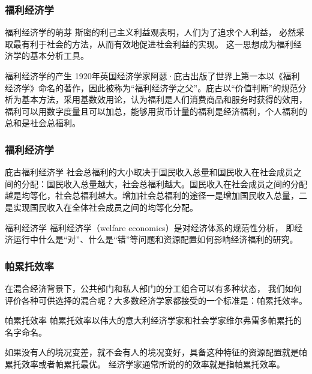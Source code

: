 \documentclass[aspectratio=169, 12pt]{beamer}
\begin{document}
\begin{frame}[plain]
    \frametitle{福利经济学}
    \begin{block}{福利经济学的萌芽}
        斯密的利己主义利益观表明，人们为了追求个人利益，
        必然采取最有利于社会的方法，从而有效地促进社会利益的实现。
        这一思想成为福利经济学的基本分析工具。
    \end{block}
    \begin{block}{福利经济学的产生}
        1920年英国经济学家阿瑟·庇古出版了世界上第一本以《福利经济学》命名的著作，因此被称为“福利经济学之父”。庇古以“价值判断”的规范分析为基本方法，采用基数效用论，认为福利是人们消费商品和服务时获得的效用，福利可以用数字度量且可以加总，能够用货币计量的福利是经济福利，个人福利的总和是社会总福利。
    \end{block}
\end{frame}

\begin{frame}[plain]
    \frametitle{福利经济学}
    \begin{block}{庇古福利经济学}
        社会总福利的大小取决于国民收入总量和国民收入在社会成员之间的分配：国民收入总量越大，社会总福利越大。国民收入在社会成员之间的分配越是均等化，社会总福利越大。增加社会总福利的途径一是增加国民收入总量，二是实现国民收入在全体社会成员之间的均等化分配。
    \end{block}
    \begin{block}{福利经济学}
        福利经济学（welfare economics）是对经济体系的规范性分析，
        即经济运行中什么是“对”、什么是“错”等问题和资源配置如何影响经济福利的研究。  
    \end{block}
\end{frame}

\begin{frame}[plain]
    \frametitle{帕累托效率}
    在混合经济背景下，公共部门和私人部门的分工组合可以有多种状态，
    我们如何评价各种可供选择的混合呢？大多数经济学家都接受的一个标准是：帕累托效率。
    \begin{block}{帕累托效率}
        帕累托效率以伟大的意大利经济学家和社会学家维尔弗雷多帕累托的名字命名。
        \par
        如果没有人的境况变差，就不会有人的境况变好，具备这种特征的资源配置就是帕累托效率或者帕累托最优。
        经济学家通常所说的的效率就是指帕累托效率。
    \end{block}
\end{frame}
\end{document}

